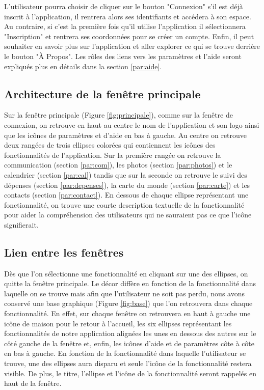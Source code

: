 \documentclass[11pt]{article}
\begin{document}
L'utilisateur pourra choisir de cliquer sur le bouton "Connexion" s'il est déjà inscrit à l'application, il rentrera alors ses identifiants et accédera à son espace. Au contraire, si c'est la première fois qu'il utilise l'application il sélectionnera "Inscription" et rentrera ses coordonnées pour se créer un compte. Enfin, il peut souhaiter en savoir plus sur l'application et aller explorer ce qui se trouve derrière le bouton "À Propos".  Les rôles des liens vers les paramètres et l'aide seront expliqués plus en détails dans la section \ref{par:aide}.

\subsection{Architecture de la fenêtre principale}
Sur la fenêtre principale  (Figure \ref{fig:principale}), comme sur la fenêtre de connexion, on retrouve en haut au centre le nom de l'application et son logo ainsi que les icônes de paramètres et d'aide en bas à gauche. Au centre on retrouve deux rangées de trois ellipses colorées qui contiennent les icônes des fonctionnalités de l'application. Sur la première rangée on retrouve la communication (section \ref{par:com}), les photos (section \ref{par:photos}) et le calendrier (section \ref{par:cal}) tandis que sur la seconde on retrouve le suivi des dépenses (section \ref{par:depenses}), la carte du monde (section \ref{par:carte}) et les contacts (section \ref{par:contact}). En dessous de chaque ellipse représentant une fonctionnalité, on trouve une courte description textuelle de la fonctionnalité pour aider la compréhension des utilisateurs qui ne sauraient pas ce que l'icône signifierait.

\subsection{Lien entre les fenêtres}
Dès que l'on sélectionne une fonctionnalité en cliquant sur une des ellipses, on quitte la fenêtre principale. Le décor diffère en fonction de la fonctionnalité dans laquelle on se trouve mais afin que l'utilisateur ne soit pas perdu, nous avons conservé une base graphique (Figure \ref{fig:base}) que l'on retrouvera dans chaque fonctionnalité. En effet, sur chaque fenêtre on retrouvera en haut à gauche une icône de maison pour le retour à l'accueil, les six ellipses représentant les fonctionnalités de notre application alignées les unes en dessous des autres sur le côté gauche de la fenêtre et, enfin, les icônes d'aide et de paramètres côte à côte en bas à gauche.
En fonction de la fonctionnalité dans laquelle l'utilisateur se trouve, une des ellipses aura disparu et seule l'icône de la fonctionnalité restera visible. De plus, le titre, l'ellipse et l'icône de la fonctionnalité seront rappelés en haut de la fenêtre.
\end{document}
